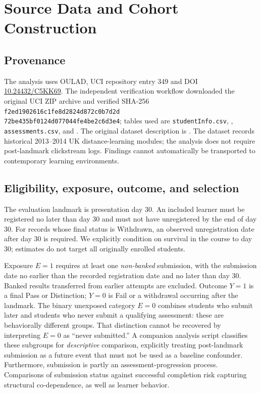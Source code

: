\documentclass[10pt,a4paper]{article}
\begin{document}
\section{Source Data and Cohort Construction}
\subsection{Provenance}
The analysis uses OULAD, UCI repository entry 349 and DOI \href{https://doi.org/10.24432/C5KK69}{10.24432/C5KK69}. The independent verification workflow downloaded the original UCI ZIP archive and verified SHA-256 \texttt{f2ed1902616c1fe8d2824d872c0b7d2d}\\\texttt{72be435bf0124d077044fe4be2c6d3e4}; tables used are \texttt{studentInfo.csv}, , \texttt{assessments.csv}, and . The original dataset description is \citep{kuzilek2017}. The dataset records historical 2013--2014 UK distance-learning modules; the analysis does not require post-landmark clickstream logs. Findings cannot automatically be transported to contemporary learning environments.

\subsection{Eligibility, exposure, outcome, and selection}
The evaluation landmark is presentation day 30. An included learner must be registered no later than day 30 and must not have unregistered by the end of day 30. For records whose final status is Withdrawn, an observed unregistration date after day 30 is required. We explicitly condition on survival in the course to day 30; estimates do not target all originally enrolled students.

Exposure $E=1$ requires at least one \emph{non-banked} submission, with the submission date no earlier than the recorded registration date and no later than day 30. Banked results transferred from earlier attempts are excluded. Outcome $Y=1$ is a final Pass or Distinction; $Y=0$ is Fail or a withdrawal occurring after the landmark. The binary unexposed category $E=0$ combines students who submit later and students who never submit a qualifying assessment: these are behaviorally different groups. That distinction cannot be recovered by interpreting $E=0$ as ``never submitted.'' A companion analysis script classifies these subgroups for \emph{descriptive} comparison, explicitly treating post-landmark submission as a future event that must not be used as a baseline confounder. Furthermore, submission is partly an assessment-progression process. Comparisons of submission status against successful completion risk capturing structural co-dependence, as well as learner behavior.
\end{document}
